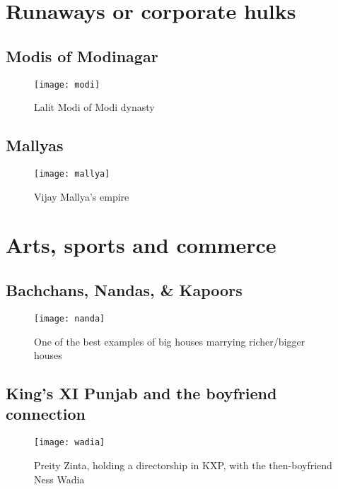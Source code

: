 \section{Runaways or corporate hulks}

\subsection{Modis of Modinagar}

\begin{figure}[H]
\begin{center}  
\texttt{[image: modi]} 
\caption{Lalit Modi of Modi dynasty}
\label{fig:modi}
\end{center}
\end{figure}


\subsection{Mallyas}

\begin{figure}[H]
\begin{center}  
\texttt{[image: mallya]} 
\caption{Vijay Mallya's empire}
\label{fig:mallya}
\end{center}
\end{figure}

\section{Arts, sports and commerce}

\subsection{Bachchans, Nandas, \& Kapoors}

\begin{figure}[H]
\begin{center}  
\texttt{[image: nanda]} 
\caption{One of the best examples of big houses marrying richer/bigger houses}
\label{fig:nanda}
\end{center}
\end{figure}

\subsection{King's XI Punjab and the boyfriend connection}

\begin{figure}[H]
\begin{center}  
\texttt{[image: wadia]} 
\caption{Preity Zinta, holding a directorship in KXP, with the then-boyfriend Ness Wadia}
\label{fig:wadia}
\end{center}
\end{figure}

